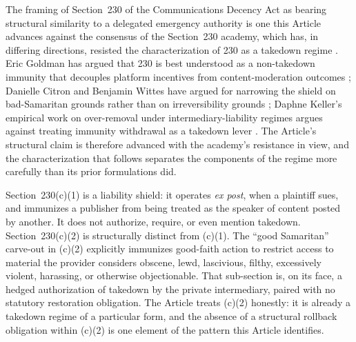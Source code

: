 The framing of Section~230 of the Communications Decency Act \cite{ref_section230} as bearing
structural similarity to a delegated emergency authority is one this Article advances against the
consensus of the Section~230 academy, which has, in differing directions, resisted the characterization
of 230 as a takedown regime \cite{ref_goldman_section230_2019,ref_citron_wittes_bad_samaritans_2017,ref_keller_overremoval_2015}.
Eric Goldman has argued that 230 is best understood as a non-takedown immunity that decouples platform
incentives from content-moderation outcomes \cite{ref_goldman_section230_2019}; Danielle Citron and
Benjamin Wittes have argued for narrowing the shield on bad-Samaritan grounds rather than on
irreversibility grounds \cite{ref_citron_wittes_bad_samaritans_2017}; Daphne Keller's empirical work on
over-removal under intermediary-liability regimes argues against treating immunity withdrawal as a
takedown lever \cite{ref_keller_overremoval_2015}.
The Article's structural claim is therefore advanced with the academy's resistance in view, and the
characterization that follows separates the components of the regime more carefully than its prior
formulations did.

Section~230(c)(1) is a liability shield: it operates \emph{ex post}, when a plaintiff sues, and
immunizes a publisher from being treated as the speaker of content posted by another.
It does not authorize, require, or even mention takedown.
Section~230(c)(2) is structurally distinct from (c)(1).
The ``good Samaritan'' carve-out in (c)(2) explicitly immunizes good-faith action to restrict access to
material the provider considers obscene, lewd, lascivious, filthy, excessively violent, harassing, or
otherwise objectionable.
That sub-section is, on its face, a hedged authorization of takedown by the private intermediary, paired
with no statutory restoration obligation.
The Article treats (c)(2) honestly: it is already a takedown regime of a particular form, and the
absence of a structural rollback obligation within (c)(2) is one element of the pattern this Article
identifies.

